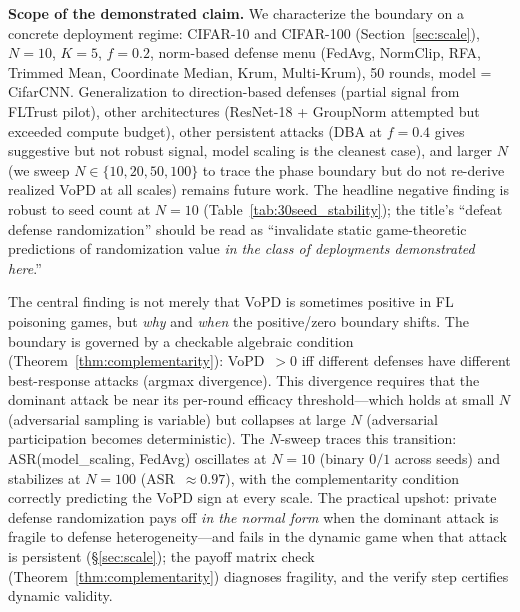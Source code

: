 \documentclass{article}
\begin{document}
\textbf{Scope of the demonstrated claim.} We characterize the boundary on a concrete deployment regime: CIFAR-10 and CIFAR-100 (Section~\ref{sec:scale}), $N{=}10$, $K{=}5$, $f{=}0.2$, norm-based defense menu (FedAvg, NormClip, RFA, Trimmed Mean, Coordinate Median, Krum, Multi-Krum), 50 rounds, model = CifarCNN. Generalization to direction-based defenses (partial signal from FLTrust pilot), other architectures (ResNet-18 + GroupNorm attempted but exceeded compute budget), other persistent attacks (DBA at $f=0.4$ gives suggestive but not robust signal, model scaling is the cleanest case), and larger $N$ (we sweep $N \in \{10, 20, 50, 100\}$ to trace the phase boundary but do not re-derive realized VoPD at all scales) remains future work. The headline negative finding is robust to seed count at $N{=}10$ (Table~\ref{tab:30seed_stability}); the title's ``defeat defense randomization'' should be read as ``invalidate static game-theoretic predictions of randomization value \emph{in the class of deployments demonstrated here}.''

The central finding is not merely that VoPD is sometimes positive in FL poisoning games, but \emph{why} and \emph{when} the positive/zero boundary shifts. The boundary is governed by a checkable algebraic condition (Theorem~\ref{thm:complementarity}): VoPD~$> 0$ iff different defenses have different best-response attacks (argmax divergence). This divergence requires that the dominant attack be near its per-round efficacy threshold---which holds at small $N$ (adversarial sampling is variable) but collapses at large $N$ (adversarial participation becomes deterministic). The $N$-sweep traces this transition: ASR(model\_scaling, FedAvg) oscillates at $N=10$ (binary $0/1$ across seeds) and stabilizes at $N=100$ (ASR~$\approx 0.97$), with the complementarity condition correctly predicting the VoPD sign at every scale. The practical upshot: private defense randomization pays off \emph{in the normal form} when the dominant attack is fragile to defense heterogeneity---and fails in the dynamic game when that attack is persistent (§\ref{sec:scale}); the payoff matrix check (Theorem~\ref{thm:complementarity}) diagnoses fragility, and the verify step certifies dynamic validity.
\end{document}

